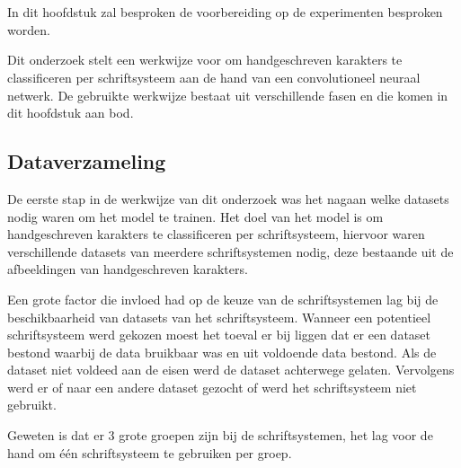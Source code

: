 
\chapter{}
\label{ch:methodologie}


In dit hoofdstuk zal besproken de voorbereiding op de experimenten besproken worden.

Dit onderzoek stelt een werkwijze voor om handgeschreven karakters te classificeren per schriftsysteem aan de hand van een convolutioneel neuraal netwerk.
De gebruikte werkwijze bestaat uit verschillende fasen en die komen in dit hoofdstuk aan bod.


\section{Dataverzameling}

De eerste stap in de werkwijze van dit onderzoek was het nagaan welke datasets nodig waren om het model te trainen.
Het doel van het model is om handgeschreven karakters te classificeren per schriftsysteem, hiervoor waren verschillende datasets van meerdere schriftsystemen nodig, deze bestaande uit de afbeeldingen van handgeschreven karakters.

Een grote factor die invloed had op de keuze van de schriftsystemen lag bij de beschikbaarheid van datasets van het schriftsysteem.
Wanneer een potentieel schriftsysteem werd gekozen moest het toeval er bij liggen dat er een dataset bestond waarbij de data bruikbaar was en uit voldoende data bestond.
Als de dataset niet voldeed aan de eisen werd de dataset achterwege gelaten.
Vervolgens werd er of naar een andere dataset gezocht of werd het schriftsysteem niet gebruikt.



Geweten is dat er 3 grote groepen zijn bij de schriftsystemen, het lag voor de hand om één schriftsysteem te gebruiken per groep.

